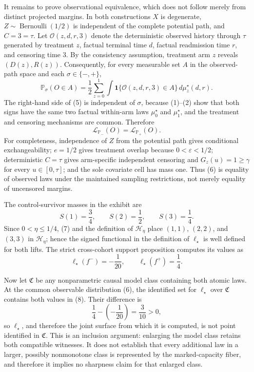 It remains to prove observational equivalence, which does not follow merely from distinct projected margins.  In both constructions \(X\) is degenerate, \(Z\sim\operatorname{Bernoulli}(1/2)\) is independent of the complete potential path, and \(C=3=\tau\).  Let \(\mathcal O(z,d,r,3)\) denote the deterministic observed history through \(\tau\) generated by treatment \(z\), factual terminal time \(d\), factual readmission time \(r\), and censoring time \(3\).  By the consistency assumption, treatment arm \(z\) reveals \((D(z),R(z))\).  Consequently, for every measurable set \(A\) in the observed-path space and each \(\sigma\in\{-,+\}\),
\[
 \mathbb P_\sigma(O\in A)
 =\frac12\sum_{z=0}^1
   \int \mathbf 1\{\mathcal O(z,d,r,3)\in A\}\,
          d\mu_z^\star(d,r).
 \tag{5}
\]
The right-hand side of (5) is independent of \(\sigma\), because (1)--(2) show that both signs have the same two factual within-arm laws \(\mu_0^\star\) and \(\mu_1^\star\), and the treatment and censoring mechanisms are common.  Therefore
\[
 \mathcal L_{\mathbb P_-}(O)=\mathcal L_{\mathbb P_+}(O).
 \tag{6}
\]
For completeness, independence of \(Z\) from the potential path gives conditional exchangeability; \(e=1/2\) gives treatment overlap because \(0<\varepsilon<1/2\); deterministic \(C=\tau\) gives arm-specific independent censoring and \(G_z(u)=1\geq\gamma\) for every \(u\in[0,\tau]\); and the sole covariate cell has mass one.  Thus (6) is equality of observed laws under the maintained sampling restrictions, not merely equality of uncensored margins.

The control-survivor masses in the exhibit are
\[
 S(1)=\frac34,\qquad S(2)=\frac12,\qquad S(3)=\frac14.
 \tag{7}
\]
Since \(0<\eta\leq1/4\), (7) and the definition of \(\mathcal H_\eta\) place \((1,1)\), \((2,2)\), and \((3,3)\) in \(\mathcal H_\eta\); hence the signed functional in the definition of \(\ell_\star\) is well defined for both lifts.  The strict cross-cohort support proposition computes its values as
\[
 \ell_\star(f^-)=-\frac1{20},\qquad
 \ell_\star(f^+)=\frac14.
 \tag{8}
\]

Now let \(\mathfrak C\) be any nonparametric causal model class containing both atomic laws.  At the common observable distribution (6), the identified set for \(\ell_\star\) over \(\mathfrak C\) contains both values in (8).  Their difference is
\[
 \frac14-\left(-\frac1{20}\right)=\frac3{10}>0,
 \tag{9}
\]
so \(\ell_\star\), and therefore the joint surface from which it is computed, is not point identified in \(\mathfrak C\).  This is an inclusion argument: enlarging the model class retains both compatible witnesses.  It does not establish that every additional law in a larger, possibly nonmonotone class is represented by the marked-capacity fiber, and therefore it implies no sharpness claim for that enlarged class.
